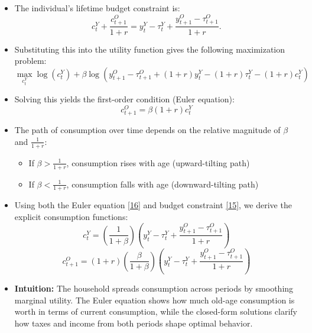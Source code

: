\documentclass[12pt]{article}
\begin{document}
\begin{itemize}
\item The individual's lifetime budget constraint is:
\[
c_t^Y + \frac{c_{t+1}^O}{1 + r} = y_t^Y - \tau_t^Y + \frac{y_{t+1}^O - \tau_{t+1}^O}{1 + r}. \tag{15}
\]

\item Substituting this into the utility function gives the following maximization problem:
\[
\max_{c_t^Y} \log(c_t^Y) + \beta \log\left( y_{t+1}^O - \tau_{t+1}^O + (1 + r) y_t^Y - (1 + r) \tau_t^Y - (1 + r) c_t^Y \right)
\]

\item Solving this yields the first-order condition (Euler equation):
\[
c_{t+1}^O = \beta (1 + r) c_t^Y \tag{16}
\]

\item The path of consumption over time depends on the relative magnitude of \( \beta \) and \( \frac{1}{1 + r} \):
\begin{itemize}
    \item If \( \beta > \frac{1}{1 + r} \), consumption rises with age (upward-tilting path)
    \item If \( \beta < \frac{1}{1 + r} \), consumption falls with age (downward-tilting path)
\end{itemize}

\item Using both the Euler equation \eqref{16} and budget constraint \eqref{15}, we derive the explicit consumption functions:
\[
c_t^Y = \left( \frac{1}{1 + \beta} \right) \left( y_t^Y - \tau_t^Y + \frac{y_{t+1}^O - \tau_{t+1}^O}{1 + r} \right) \tag{17}
\]
\[
c_{t+1}^O = (1 + r) \left( \frac{\beta}{1 + \beta} \right) \left( y_t^Y - \tau_t^Y + \frac{y_{t+1}^O - \tau_{t+1}^O}{1 + r} \right) \tag{18}
\]

\item \textbf{Intuition:} The household spreads consumption across periods by smoothing marginal utility. The Euler equation shows how much old-age consumption is worth in terms of current consumption, while the closed-form solutions clarify how taxes and income from both periods shape optimal behavior.
\end{itemize}
\end{document}
